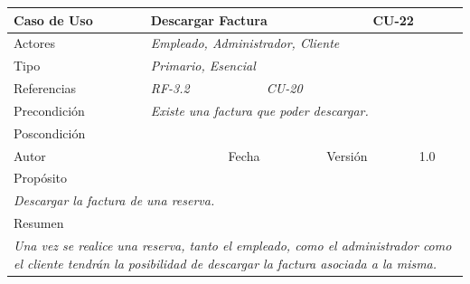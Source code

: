 \begin{table}[H]
    \begin{tabular}{|llllllll|}
    \hline
    \multicolumn{1}{|l|}{Caso de Uso}       & \multicolumn{5}{l|}{Descargar Factura}                                                                          & \multicolumn{2}{l|}{\cellcolor[HTML]{E6E6E6}CU-22}          \\ \hline
    \multicolumn{1}{|l|}{Actores}           & \multicolumn{7}{l|}{{\color[HTML]{808080} \textit{Empleado, Administrador, Cliente}}}                                                                                                                           \\ \hline
    \multicolumn{1}{|l|}{Tipo}              & \multicolumn{7}{l|}{{\color[HTML]{808080} \textit{Primario, Esencial}}}                                                                                                                \\ \hline
    \multicolumn{1}{|l|}{Referencias}       & \multicolumn{2}{l|}{{\color[HTML]{808080} \textit{RF-3.2}}}              & \multicolumn{5}{l|}{{\color[HTML]{808080} \textit{CU-20}}}                                                                                       \\ \hline
    \multicolumn{1}{|l|}{Precondición}      & \multicolumn{7}{l|}{{\color[HTML]{808080} \textit{Existe una factura que poder descargar.}}}                                                                                                \\ \hline
    \multicolumn{1}{|l|}{Poscondición}      & \multicolumn{7}{l|}{}                                                                                                                                                                  \\ \hline
    \multicolumn{1}{|l|}{Autor}             & \multicolumn{1}{l|}{}                        & \multicolumn{2}{l|}{Fecha}           & \multicolumn{1}{l|}{}     & \multicolumn{2}{l|}{Versión}         & 1.0                           \\ \hline
    \multicolumn{8}{|l|}{\cellcolor[HTML]{F2F2F2}Propósito}                                                                                                                                                                          \\ \hline
    \multicolumn{8}{|p{15cm}|}{{\color[HTML]{808080} \textit{Descargar la factura de una reserva.}}}                                                                                                           \\ \hline
    \multicolumn{8}{|l|}{\cellcolor[HTML]{F2F2F2}Resumen}                                                                                                                                                                            \\ \hline
    \multicolumn{8}{|p{15cm}|}{{\color[HTML]{808080} \textit{Una vez se realice una reserva, tanto el empleado, como el administrador como el cliente tendrán la posibilidad de descargar la factura asociada a la misma.}}} \\ \hline
    \end{tabular}
\end{table}

